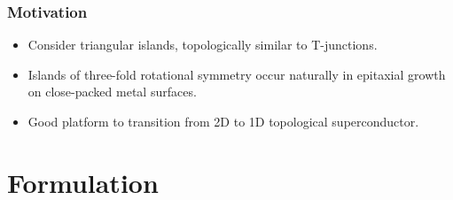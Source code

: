 \documentclass[xcolor=dvipsnames,10pt,aspectratio=169]{beamer}
\newcommand{\MO}{Motivation}
\newcommand{\FO}{Formulation}
\begin{document}
  \begin{frame}
    \frametitle{\MO}
    \begin{multicols}{2}

    \begin{itemize}
      \item Consider triangular islands, topologically similar to T-junctions.
      \item Islands of three-fold rotational symmetry occur naturally in epitaxial growth on close-packed metal surfaces.
      \item Good platform to transition from 2D to 1D topological superconductor.
    \end{itemize}
    \newline

    \begin{figure}
      \end{figure}
    \end{multicols}

  \end{frame}

  \section{\FO}
\end{document}
